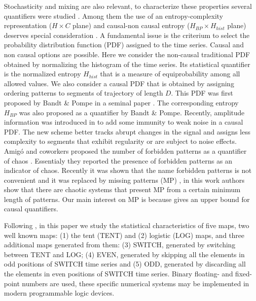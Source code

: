 Stochasticity and mixing are also relevant, to characterize these properties several quantifiers were studied \cite{DeMicco2009}.
Among them the use of an entropy-complexity representation ($H \times C$ plane) and causal-non causal entropy ($H_{BP} \times H_{hist}$ plane) deserves special consideration \cite{DeMicco2009,Rosso2007,DeMicco2008,DeMicco2012,Rosso2010,Antonelli2017}.
A fundamental issue is the criterium to select the probability distribution function (PDF) assigned to the time series.
Causal and non causal options are possible.
Here we consider the non-causal traditional PDF obtained by normalizing the histogram of the time series.
Its statistical quantifier is the normalized entropy $H_{hist}$ that is a measure of equiprobability among all allowed values.
We also consider a causal PDF that is obtained by assigning ordering patterns to segments of trajectory of length $D$.
This PDF was first proposed by Bandt \& Pompe in a seminal paper \cite{Bandt2002}.
The corresponding entropy $H_{BP}$ was also proposed as a quantifier by Bandt \& Pompe.
Recently, amplitude information was introduced in \cite{Fadlallah2013} to add some immunity to weak noise in a causal PDF.
The new scheme better tracks abrupt changes in the signal and assigns less complexity to segments that exhibit regularity or are subject to noise effects.
Amig\'o and coworkers proposed the number of forbidden patterns as a quantifier of chaos \cite{Amigo2007a}.
Essentialy they reported the presence of forbidden patterns as an indicator of chaos.
Recently it was shown that the name forbidden patterns is not convenient and it was replaced by missing patterns (MP) \cite{Rosso2012}, in this work authors show that there are chaotic systems that present MP from a certain minimum length of patterns.
Our main interest on MP is because gives an upper bound for causal quantifiers.

Following \cite{Nagaraj2008}, in this paper we study the statistical characteristics of five maps, two well known maps: (1) the tent (TENT) and (2) logistic (LOG) maps, and three additional maps generated from them: (3) SWITCH, generated by switching between TENT and LOG; (4) EVEN, generated by skipping all the elements in odd positions of SWITCH time series and (5) ODD, generated by discarding all the elements in even positions of SWITCH time series.
Binary floating- and fixed-point numbers are used, these specific numerical systems may be implemented in modern programmable logic devices.

